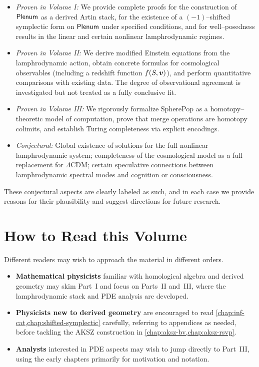 \begin{itemize}
  \item \emph{Proven in Volume I:} We provide complete proofs for the
  construction of $\mathsf{Plenum}$ as a derived Artin stack, for the existence of a
  $(-1)$--shifted symplectic form on $\mathsf{Plenum}$ under specified conditions, and
  for well--posedness results in the linear and certain nonlinear lamphrodynamic
  regimes.

  \item \emph{Proven in Volume II:} We derive modified Einstein equations from
  the lamphrodynamic action, obtain concrete formulas for cosmological
  observables (including a redshift function $f(S,\bm{v})$), and
  perform quantitative comparisons with existing data. The degree of
  observational agreement is investigated but not treated as a fully
  conclusive fit.

  \item \emph{Proven in Volume III:} We rigorously formalize SpherePop as a
  homotopy--theoretic model of computation, prove that merge operations are
  homotopy colimits, and establish Turing completeness via explicit encodings.

  \item \emph{Conjectural:} Global existence of solutions for the full
  nonlinear lamphrodynamic system; completeness of the cosmological model as a
  full replacement for $\Lambda$CDM; certain speculative connections between
  lamphrodynamic spectral modes and cognition or consciousness.
\end{itemize}

These conjectural aspects are clearly labeled as such, and in each case we
provide reasons for their plausibility and suggest directions for future
research.

\section{How to Read this Volume}

Different readers may wish to approach the material in different orders.

\begin{itemize}
  \item \textbf{Mathematical physicists} familiar with homological algebra and
  derived geometry may skim Part~I and focus on Parts~II and~III, where the
  lamphrodynamic stack and PDE analysis are developed.

  \item \textbf{Physicists new to derived geometry} are encouraged to read
  \cref{chap:inf-cat,chap:shifted-symplectic} carefully, referring to
  appendices as needed, before tackling the AKSZ construction in
  \cref{chap:aksz-bv,chap:aksz-rsvp}.

  \item \textbf{Analysts} interested in PDE aspects may wish to jump directly
  to Part~III, using the early chapters primarily for motivation and notation.
\end{itemize}

